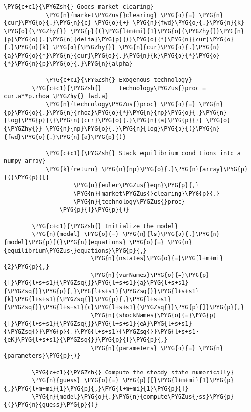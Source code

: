 \documentclass[letterpaper,10pt,openany,oneside,english]{sphinxmanual}
\begin{document}
\begin{Verbatim}[commandchars=\\\{\}]
            \PYG{c+c1}{\PYGZsh{} Goods market clearing}
            \PYG{n}{market\PYGZus{}clearing} \PYG{o}{=} \PYG{n}{cur}\PYG{o}{.}\PYG{n}{c} \PYG{o}{+} \PYG{n}{fwd}\PYG{o}{.}\PYG{n}{k} \PYG{o}{\PYGZhy{}} \PYG{p}{(}\PYG{l+m+mi}{1}\PYG{o}{\PYGZhy{}}\PYG{n}{p}\PYG{o}{.}\PYG{n}{delta}\PYG{p}{)}\PYG{o}{*}\PYG{n}{cur}\PYG{o}{.}\PYG{n}{k} \PYG{o}{\PYGZhy{}} \PYG{n}{cur}\PYG{o}{.}\PYG{n}{a}\PYG{o}{*}\PYG{n}{cur}\PYG{o}{.}\PYG{n}{k}\PYG{o}{*}\PYG{o}{*}\PYG{n}{p}\PYG{o}{.}\PYG{n}{alpha}
        
            \PYG{c+c1}{\PYGZsh{} Exogenous technology}
        \PYG{c+c1}{\PYGZsh{}     technology\PYGZus{}proc = cur.a**p.rhoa \PYGZhy{} fwd.a}
            \PYG{n}{technology\PYGZus{}proc} \PYG{o}{=} \PYG{n}{p}\PYG{o}{.}\PYG{n}{rhoa}\PYG{o}{*}\PYG{n}{np}\PYG{o}{.}\PYG{n}{log}\PYG{p}{(}\PYG{n}{cur}\PYG{o}{.}\PYG{n}{a}\PYG{p}{)} \PYG{o}{\PYGZhy{}} \PYG{n}{np}\PYG{o}{.}\PYG{n}{log}\PYG{p}{(}\PYG{n}{fwd}\PYG{o}{.}\PYG{n}{a}\PYG{p}{)}
        
            \PYG{c+c1}{\PYGZsh{} Stack equilibrium conditions into a numpy array}
            \PYG{k}{return} \PYG{n}{np}\PYG{o}{.}\PYG{n}{array}\PYG{p}{(}\PYG{p}{[}
                    \PYG{n}{euler\PYGZus{}eqn}\PYG{p}{,}
                    \PYG{n}{market\PYGZus{}clearing}\PYG{p}{,}
                    \PYG{n}{technology\PYGZus{}proc}
                \PYG{p}{]}\PYG{p}{)}
        
        \PYG{c+c1}{\PYGZsh{} Initialize the model}
        \PYG{n}{model} \PYG{o}{=} \PYG{n}{ls}\PYG{o}{.}\PYG{n}{model}\PYG{p}{(}\PYG{n}{equations} \PYG{o}{=} \PYG{n}{equilibrium\PYGZus{}equations}\PYG{p}{,}
                         \PYG{n}{nstates}\PYG{o}{=}\PYG{l+m+mi}{2}\PYG{p}{,}
                         \PYG{n}{varNames}\PYG{o}{=}\PYG{p}{[}\PYG{l+s+s1}{\PYGZsq{}}\PYG{l+s+s1}{a}\PYG{l+s+s1}{\PYGZsq{}}\PYG{p}{,}\PYG{l+s+s1}{\PYGZsq{}}\PYG{l+s+s1}{k}\PYG{l+s+s1}{\PYGZsq{}}\PYG{p}{,}\PYG{l+s+s1}{\PYGZsq{}}\PYG{l+s+s1}{c}\PYG{l+s+s1}{\PYGZsq{}}\PYG{p}{]}\PYG{p}{,}
                         \PYG{n}{shockNames}\PYG{o}{=}\PYG{p}{[}\PYG{l+s+s1}{\PYGZsq{}}\PYG{l+s+s1}{eA}\PYG{l+s+s1}{\PYGZsq{}}\PYG{p}{,}\PYG{l+s+s1}{\PYGZsq{}}\PYG{l+s+s1}{eK}\PYG{l+s+s1}{\PYGZsq{}}\PYG{p}{]}\PYG{p}{,}
                         \PYG{n}{parameters} \PYG{o}{=} \PYG{n}{parameters}\PYG{p}{)}
        
        \PYG{c+c1}{\PYGZsh{} Compute the steady state numerically}
        \PYG{n}{guess} \PYG{o}{=} \PYG{p}{[}\PYG{l+m+mi}{1}\PYG{p}{,}\PYG{l+m+mi}{1}\PYG{p}{,}\PYG{l+m+mi}{1}\PYG{p}{]}
        \PYG{n}{model}\PYG{o}{.}\PYG{n}{compute\PYGZus{}ss}\PYG{p}{(}\PYG{n}{guess}\PYG{p}{)}
        

\end{Verbatim}
\end{document}
